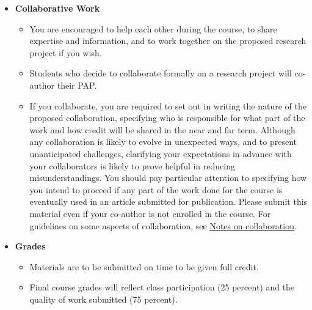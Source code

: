 \documentclass[11pt]{article}
\begin{document}
\begin{itemize}
\begin{itemize}
{site}. Your 
pre-analysis plan will likely omit some of the items on this list. For instance, it is unlikely that 
you will include a formal model in your project. You should adapt the guidelines as appropriate.
\item At a minimum, your pre-analysis plan should include a description of the data you will use and how you selected your 
sample, the hypotheses you will test, how you plan to construct your measures and 
variables, the equation(-s) you plan to estimate, and a plan for dealing with multiple 
hypothesis testing. 
\item For some illustrations of the process, see the work in progress reported under Graeme Blair, \href{https://graemeblair.com/project/declare-design/}{``Improving Research Designs in the Social Sciences.''}				\end{itemize}
	\item \textbf{Collaborative Work}
		\begin{itemize}
	\item You are encouraged to help each other during the course, to share expertise and information, and to work together on the proposed research project if you wish.
		\item Students who decide to collaborate formally on a research project will co-author their PAP.
	\item If you collaborate, you are required to set out in writing the nature of the proposed collaboration, 
specifying who is responsible for what part of the work and how credit will be 
shared in the near and far term. Although any collaboration is likely to evolve in unexpected ways, and to present unanticipated
challenges, clarifying your expectations in advance with your collaborators is likely to prove helpful in reducing misunderstandings.
You should pay particular attention to specifying how you intend to proceed if any part of the work done for the 
course is eventually used in an article submitted for publication. Please submit this
			material even if your co-author is not enrolled in the course.	For guidelines on some aspects of collaboration, see \href{https://docs.wixstatic.com/ugd/02c1bf_454ad351837e4014b5342e1a54182b54.pdf}{Notes on collaboration}.				
			\end{itemize}
			\item \textbf{Grades}
			\begin{itemize}
			\item Materials are to be submitted on time to be given full credit. 			
			\item Final course grades will reflect class participation (25 percent) and the quality of work submitted (75 percent). 

\end{itemize}
\end{itemize}
\end{document}
